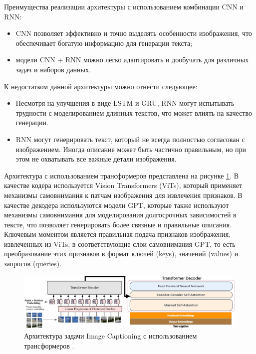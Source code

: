 \documentclass[a4paper,12pt]{extarticle}
\begin{document}
Преимущества реализации архитектуры с использованием комбинации CNN и RNN:
\begin{itemize}
	\item CNN позволяет эффективно и точно выделять особенности изображения, что обеспечивает богатую информацию для генерации текста; 
	\item модели CNN + RNN можно легко адаптировать и дообучать для различных задач и наборов данных.
\end{itemize}

К недостатком данной архитектуры можно отнести следующее:
\begin{itemize}
	\item Несмотря на улучшения в виде LSTM и GRU, RNN могут испытывать трудности с моделированием длинных текстов, что может влиять на качество генерации. 
	\item RNN могут генерировать текст, который не всегда полностью согласован с изображением. Иногда описание может быть частично правильным, но при этом не охватывать все важные детали изображения.
\end{itemize}


Архитектура  с использованием трансформеров представлена на рисунке \ref{fig:image-caption-transformers}. В качестве кодера используется Vision Transformers (ViTs), который применяет механизмы самовнимания к патчам изображения для извлечения признаков. В качестве декодера используются модели GPT, которые также используют механизмы самовнимания для моделирования долгосрочных зависимостей в тексте, что позволяет генерировать более связные и правильные описания. Ключевым моментом является правильная подача признаков изображения, извлеченных из ViTs, в соответствующие слои самовнимания GPT, то есть преобразование этих признаков в формат ключей (keys), значений (values) и запросов (queries).

\begin{figure}[ht]
	\centering
	\includegraphics[scale=0.35]{image-caption-transformers.png}
	\caption{Архитектура задачи Image Captioning с использованием трансформеров \cite{vit-gpt2-image-captioning}.}
	\label{fig:image-caption-transformers}
\end{figure}
\end{document}
